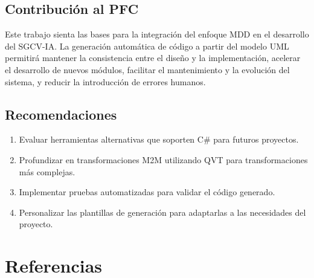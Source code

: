 \documentclass[12pt,a4paper]{article}
\begin{document}
\subsection{Contribución al PFC}

Este trabajo sienta las bases para la integración del enfoque MDD en el desarrollo del SGCV-IA. La generación automática de código a partir del modelo UML permitirá mantener la consistencia entre el diseño y la implementación, acelerar el desarrollo de nuevos módulos, facilitar el mantenimiento y la evolución del sistema, y reducir la introducción de errores humanos.

\subsection{Recomendaciones}

\begin{enumerate}
    \item Evaluar herramientas alternativas que soporten C\# para futuros proyectos.
    \item Profundizar en transformaciones M2M utilizando QVT para transformaciones más complejas.
    \item Implementar pruebas automatizadas para validar el código generado.
    \item Personalizar las plantillas de generación para adaptarlas a las necesidades del proyecto.
\end{enumerate}

\newpage
\section{Referencias}
\end{document}
